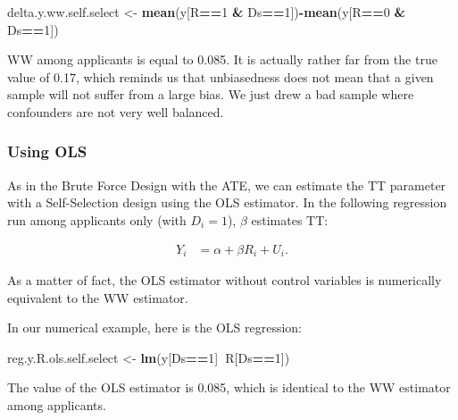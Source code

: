 \documentclass[]{book}
\newenvironment{Shaded}{\begin{snugshade}}{\end{snugshade}}
\newcommand{\KeywordTok}[1]{\textcolor[rgb]{0.13,0.29,0.53}{\textbf{#1}}}
\newcommand{\DecValTok}[1]{\textcolor[rgb]{0.00,0.00,0.81}{#1}}
\newcommand{\StringTok}[1]{\textcolor[rgb]{0.31,0.60,0.02}{#1}}
\newcommand{\OperatorTok}[1]{\textcolor[rgb]{0.81,0.36,0.00}{\textbf{#1}}}
\newcommand{\NormalTok}[1]{#1}
\theoremstyle{definition}
\theoremstyle{definition}
\theoremstyle{definition}
\theoremstyle{remark}
\let\BeginKnitrBlock\begin \let\EndKnitrBlock\end
\begin{document}
\begin{Shaded}
\begin{Highlighting}[]
\NormalTok{delta.y.ww.self.select <-}\StringTok{ }\KeywordTok{mean}\NormalTok{(y[R}\OperatorTok{==}\DecValTok{1} \OperatorTok{&}\StringTok{ }\NormalTok{Ds}\OperatorTok{==}\DecValTok{1}\NormalTok{])}\OperatorTok{-}\KeywordTok{mean}\NormalTok{(y[R}\OperatorTok{==}\DecValTok{0} \OperatorTok{&}\StringTok{ }\NormalTok{Ds}\OperatorTok{==}\DecValTok{1}\NormalTok{])}
\end{Highlighting}
\end{Shaded}

WW among applicants is equal to 0.085. It is actually rather far from
the true value of 0.17, which reminds us that unbiasedness does not mean
that a given sample will not suffer from a large bias. We just drew a
bad sample where confounders are not very well balanced.

\subsubsection{Using OLS}\label{using-ols-1}

As in the Brute Force Design with the ATE, we can estimate the TT
parameter with a Self-Selection design using the OLS estimator. In the
following regression run among applicants only (with \(D_i=1\)),
\(\beta\) estimates TT:

\begin{align*}
    Y_i &  = \alpha +  \beta R_i + U_i.
    \end{align*}

As a matter of fact, the OLS estimator without control variables is
numerically equivalent to the WW estimator.

\BeginKnitrBlock{example}
\protect\hypertarget{exm:unnamed-chunk-84}{}{\label{exm:unnamed-chunk-84}
}In our numerical example, here is the OLS regression:
\EndKnitrBlock{example}

\begin{Shaded}
\begin{Highlighting}[]
\NormalTok{reg.y.R.ols.self.select <-}\StringTok{ }\KeywordTok{lm}\NormalTok{(y[Ds}\OperatorTok{==}\DecValTok{1}\NormalTok{]}\OperatorTok{~}\NormalTok{R[Ds}\OperatorTok{==}\DecValTok{1}\NormalTok{])}
\end{Highlighting}
\end{Shaded}

The value of the OLS estimator is 0.085, which is identical to the WW
estimator among applicants.
\end{document}
